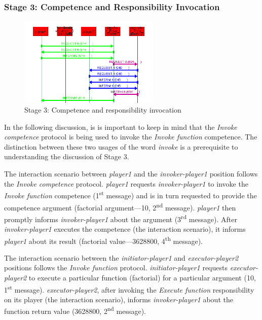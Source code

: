 \subsubsection*{Stage 3: Competence and Responsibility Invocation}

\begin{figure}[H]
	\centering
	\includegraphics[width=0.6\textwidth]{images/examples/example1-stage3}
	\caption{Stage 3: Competence and responsibility invocation}
	\label{figure:example1-stage3}
\end{figure}

In the following discussion, is is important to keep in mind that the \textit{Invoke competence} protocol is being used to invoke the \textit{Invoke function} competence.
The distinction between these two usages of the word \textit{invoke} is a prerequisite to understanding the discussion of Stage 3.

The {} interaction scenario between \textit{player1} and the \textit{invoker-player1} position follows the \textit{Invoke competence} protocol.
\textit{player1} requests \textit{invoker-player1} to invoke the \textit{Invoke function} competence (1\textsuperscript{st} message) and is in turn requested to provide the competence argument (factorial argument---10, 2\textsuperscript{nd} message).
\textit{player1} then promptly informs \textit{invoker-player1} about the argument (3\textsuperscript{rd} message).
After \textit{invoker-player1} executes the competence (the {} interaction scenario), it informs \textit{player1} about its result (factorial value---3628800, 4\textsuperscript{th} message).

The {} interaction scenario between the \textit{initiator-player1} and \textit{executor-player2} positions follows the \textit{Invoke function} protocol.
\textit{initiator-player1} requests \textit{executor-player2} to execute a particular function (factorial) for a particular argument (10, 1\textsuperscript{st} message).
\textit{executor-player2}, after invoking the \textit{Execute function} responsibility on its player (the {} interaction scenario), informs \textit{invoker-player1} about the function return value (3628800, 2\textsuperscript{nd} message).

